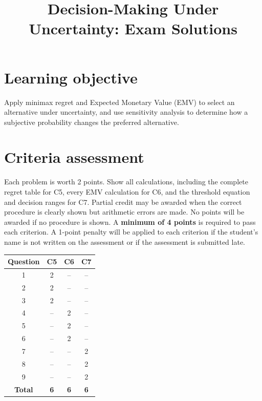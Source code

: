 \makeatletter
{}
\makeatother



\title{Decision-Making Under Uncertainty: Exam Solutions}
\author{}
\date{}


	\maketitle
	\vspace{-2cm}
	\setcounter{tocdepth}{1}
	\setcounter{secnumdepth}{2}
	\label{toc}
	\tableofcontents

	\vspace{-5mm}
	\section*{Learning objective}\vspace{-5mm}
	Apply minimax regret and Expected Monetary Value (EMV) to select an alternative under uncertainty, and use sensitivity analysis to determine how a subjective probability changes the preferred alternative.

		\section*{Criteria assessment}\vspace{-5mm}
		Each problem is worth 2 points. Show all calculations, including the complete regret table for C5, every EMV calculation for C6, and the threshold equation and decision ranges for C7. Partial credit may be awarded when the correct procedure is clearly shown but arithmetic errors are made. No points will be awarded if no procedure is shown.
		A \textbf{minimum of 4 points} is required to pass each criterion. A 1-point penalty will be applied to each criterion if the student's name is not written on the assessment or if the assessment is submitted late.

		\begin{center}
			\begin{tabular}{|c|c|c|c|}
				\hline
				\textbf{Question} & \textbf{C5} & \textbf{C6} & \textbf{C7} \\ \hline
				1 & 2 & -- & -- \\ \hline
				2 & 2 & -- & -- \\ \hline
				3 & 2 & -- & -- \\ \hline
				4 & -- & 2 & -- \\ \hline
				5 & -- & 2 & -- \\ \hline
				6 & -- & 2 & -- \\ \hline
				7 & -- & -- & 2 \\ \hline
				8 & -- & -- & 2 \\ \hline
				9 & -- & -- & 2 \\ \hline
				\textbf{Total} & \textbf{6} & \textbf{6} & \textbf{6} \\ \hline
			\end{tabular}
		\end{center}

